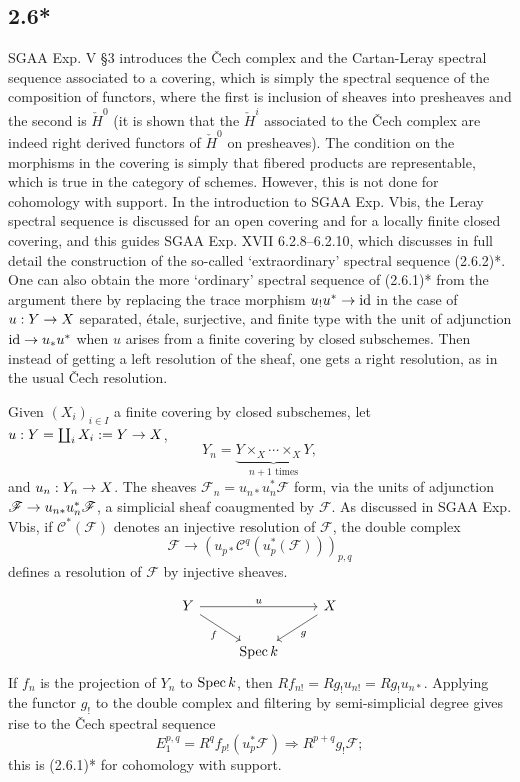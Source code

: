 \documentclass[deligne.tex]{subfiles}
\begin{document}
\subsection*{2.6*}
SGAA Exp. V \S3 introduces the \v Cech complex and the Cartan-Leray spectral
sequence associated to a covering, which is simply the spectral sequence of
the composition of functors, where the first is inclusion of sheaves into 
presheaves and the second is $\check H^0$ (it is shown that the $\check H^i$ 
associated to the \v Cech complex are indeed right derived functors of
$\check H^0$ on presheaves). The condition on the morphisms in the covering
is simply that fibered products are representable, which is true in the
category of schemes.
However, this is not done for cohomology with support.
In the introduction to SGAA Exp. Vbis, the Leray spectral sequence is 
discussed for an open covering and for a locally finite closed covering,
and this guides SGAA Exp. XVII 6.2.8--6.2.10, which discusses in full detail
the construction of the so-called `extraordinary' spectral sequence
(2.6.2)*. One can also obtain the
more `ordinary' spectral sequence of (2.6.1)* from the argument there by
replacing the trace morphism $u_!u^*\rightarrow\operatorname{id}$ in the case of $u:Y\rightarrow X$ 
separated, étale, surjective, and finite type with the unit of adjunction
$\operatorname{id}\rightarrow u_*u^*$ when $u$ arises from a finite covering by closed subschemes.
Then instead of getting a left resolution of the sheaf, one gets a right
resolution, as in the usual \v Cech resolution.

Given $(X_i)_{i\in I}$ a finite covering by closed subschemes, let
$u:Y=\coprod_i X_i:=Y\rightarrow X$,
\begin{equation*}
	Y_n=\underbrace{Y\times_X\cdots\times_X Y}_{n+1\text{ times}},
\end{equation*}
and $u_n:Y_n\rightarrow X$. The sheaves $\mathscr F_n=u_{n*}u_n^*\mathscr F$ form,
via the units of adjunction $\mathscr F\rightarrow u_{n*}u_n^*\mathscr F$, a
simplicial sheaf coaugmented by $\mathscr F$.
As discussed in SGAA Exp. Vbis, if $\mathscr C^*(\mathscr F)$ denotes an
injective resolution of $\mathscr F$, the double complex
\begin{equation*}
	\mathscr F\rightarrow (u_{p*}\mathscr C^q(u_p^*(\mathscr F)))_{p,q}
\end{equation*}
defines a resolution of $\mathscr F$ by injective sheaves.

\begin{equation*}\begin{tikzcd}
	Y\arrow[rr,"u"]\arrow[dr,"f"']&&X\arrow[dl,"g"] \\
	&\Spec k
\end{tikzcd}\end{equation*}
If $f_n$ is the projection of $Y_n$ to $\operatorname{Spec} k$, then
$Rf_{n!}=Rg_!u_{n!}=Rg_!u_{n*}$. Applying the functor $g_!$ to the double
complex and filtering by semi-simplicial degree gives rise to the
\v Cech spectral sequence
\begin{equation*}
	E_1^{p,q}=R^qf_{p!}(u_p^*\mathscr F)\Rightarrow R^{p+q}g_!\mathscr F;
\end{equation*}
this is (2.6.1)* for cohomology with support.
\end{document}
